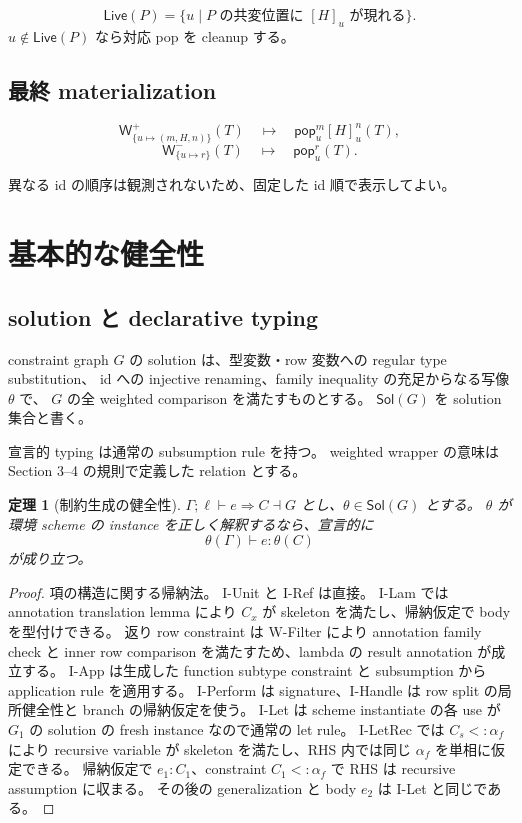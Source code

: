 \documentclass[uplatex,dvipdfmx,a4paper,10.5pt]{jsarticle}
\theoremstyle{jpplain}
\newtheorem{theorem}[definition]{定理}
\newcommand{\PWeight}[2]{\mathsf{W}^{+}_{#1}(#2)}
\newcommand{\NWeight}[2]{\mathsf{W}^{-}_{#1}(#2)}
\newcommand{\takeop}[2]{[#1]_{#2}}
\newcommand{\popop}[1]{\mathsf{pop}_{#1}}
\newcommand{\live}{\mathsf{Live}}
\newcommand{\sol}{\mathsf{Sol}}
\begin{document}
\[
  \live(P)=\{u\mid P\text{ の共変位置に }\takeop{H}{u}\text{ が現れる}\}.
\]
$u\notin\live(P)$ なら対応 pop を cleanup する。

\subsection{最終 materialization}

\[
\PWeight{\{u\mapsto(m,H,n)\}}{T}
\quad\mapsto\quad
\popop{u}^{m}\takeop{H}{u}^{n}(T),
\]
\[
\NWeight{\{u\mapsto r\}}{T}
\quad\mapsto\quad
\popop{u}^{r}(T).
\]

異なる id の順序は観測されないため、固定した id 順で表示してよい。

\section{基本的な健全性}

\subsection{solution と declarative typing}

constraint graph $G$ の solution は、型変数・row 変数への regular type substitution、
id への injective renaming、family inequality の充足からなる写像 $\theta$ で、
$G$ の全 weighted comparison を満たすものとする。
$\sol(G)$ を solution 集合と書く。

宣言的 typing は通常の subsumption rule を持つ。
weighted wrapper の意味は Section 3--4 の規則で定義した relation とする。

\begin{theorem}[制約生成の健全性]
$\Gamma;\ell\vdash e\Rightarrow C\dashv G$ とし、$\theta\in\sol(G)$ とする。
$\theta$ が環境 scheme の instance を正しく解釈するなら、宣言的に
\[
  \theta(\Gamma)\vdash e:\theta(C)
\]
が成り立つ。
\end{theorem}

\begin{proof}
項の構造に関する帰納法。
I-Unit と I-Ref は直接。
I-Lam では annotation translation lemma により $C_x$ が skeleton を満たし、帰納仮定で body を型付けできる。
返り row constraint は W-Filter により annotation family check と inner row comparison を満たすため、lambda の result annotation が成立する。
I-App は生成した function subtype constraint と subsumption から application rule を適用する。
I-Perform は signature、I-Handle は row split の局所健全性と branch の帰納仮定を使う。
I-Let は scheme instantiate の各 use が $G_1$ の solution の fresh instance なので通常の let rule。
I-LetRec では $C_s<:\alpha_f$ により recursive variable が skeleton を満たし、RHS 内では同じ $\alpha_f$ を単相に仮定できる。
帰納仮定で $e_1:C_1$、constraint $C_1<:\alpha_f$ で RHS は recursive assumption に収まる。
その後の generalization と body $e_2$ は I-Let と同じである。
\end{proof}
\end{document}
